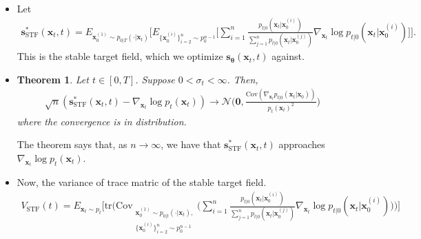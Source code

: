 \documentclass[10pt]{article}
\newtheorem{theorem}[lemma]{Theorem}
\newcommand{\Cov}{\mathrm{Cov}}
\newcommand{\ve}[1]{\mathbf{#1}}
\newcommand{\ves}[1]{\boldsymbol{#1}}
\newcommand{\mrm}[1]{\mathrm{#1}}
\newcommand{\mcal}[1]{\mathcal{#1}}
\newcommand{\tr}{\mathrm{tr}}
\begin{document}
\begin{itemize}
  \item Let
  \begin{align*}
    \ve{s}^*_{\mrm{STF}}(\ve{x}_t, t) = E_{\ve{x}^{(1)}_0 \sim p_{0|T}(\cdot|\ve{x}_t)} \Bigg[ 
      E_{\{ \ve{x}^{(i)}_0 \}_{i=2}^n \sim p_0^{n-1}} \bigg[
        \sum_{i=1}^n \frac{p_{t|0}(\ve{x}_t|\ve{x}^{(i)}_0)}{\sum_{j=1}^n p_{t|0}(\ve{x}_t|\ve{x}_0^{(j)})} \nabla_{\ve{x}_t} \log p_{t|0} (\ve{x}_t|\ve{x}^{(i)}_{0})
      \bigg]      
    \Bigg].
  \end{align*}
  This is the stable target field, which we optimize $\ve{s}_{\ves{\theta}}(\ve{x}_t, t)$ against.

  \item \begin{theorem}
    Let $t \in [0, T]$. Suppose $0 < \sigma_t < \infty$. Then,
    \begin{align*}
      \sqrt{n}(\ve{s}^*_{\mrm{STF}}(\ve{x}_t, t) - \nabla_{\ve{x}_t}\log p_t(\ve{x}_t)) \rightarrow \mcal{N}\bigg( \ve{0}, \frac{\Cov(\nabla_{\ve{x}_t}p_{t|0}(\ve{x}_t|\ve{x}_0)) }{p_t(\ve{x}_t)^2} \bigg)
    \end{align*}
    where the convergence is in distribution.
  \end{theorem}
  The theorem says that, as $n \rightarrow \infty$, we have that $\ve{s}^*_{\mrm{STF}}(\ve{x}_t, t)$ approaches $\nabla_{\ve{x}_t}\log p_t(\ve{x}_t)$.

  \item Now, the variance of trace matric of the stable target field.
  \begin{align*}
    V_{\mrm{STF}}(t) = E_{\ve{x}_t \sim p_t} \Bigg[ \tr \bigg( \Cov_{\substack{ \ve{x}^{(1)}_0 \sim p_{0|t}(\cdot|\ve{x}_t),\\ \{ \ve{x}^{(i)}_0 \}_{i=2}^{n} \sim p_0^{n-1}}} \bigg( 
      \sum_{i=1}^n \frac{p_{t|0}(\ve{x}_t|\ve{x}^{(i)}_0)}{\sum_{j=1}^n p_{t|0}(\ve{x}_t|\ve{x}_0^{(j)})} \nabla_{\ve{x}_t} \log p_{t|0} (\ve{x}_t|\ve{x}^{(i)}_{0})
    \bigg) \bigg) \Bigg]
  \end{align*}


\end{itemize}
\end{document}
